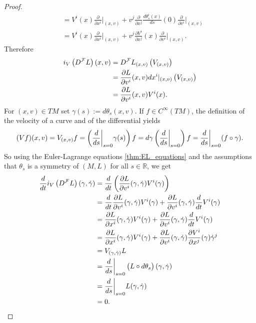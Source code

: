 \begin{proof}
\begin{align*}
		&= V^i(x)\frac{\partial}{\partial x^i}\bigg\vert_{(x,v)} + v^j\frac{\partial}{\partial x^j} \frac{d \theta_s^i(x)}{ds}(0) \frac{\partial}{\partial v^i}\bigg\vert_{(x,v)}\\
		&= V^i(x)\frac{\partial}{\partial x^i}\bigg\vert_{(x,v)} + v^j\frac{\partial V^i}{\partial x^j}(x) \frac{\partial}{\partial v^i}\bigg\vert_{(x,v)}.
	\end{align*}
	Therefore
	\begin{align*}
		i_V\del[1]{D^\mathcal{F}L}(x,v) &= D^\mathcal{F}L_{(x,v)}\del[1]{V_{(x,v)}}\\
		&= \frac{\partial L}{\partial v^i}(x,v)dx^i\vert_{(x,v)}\del[1]{V_{(x,v)}}\\
		&= \frac{\partial L}{\partial v^i}(x,v) V^i(x).
	\end{align*}
	For $(x,v) \in TM$ set $\gamma(s) := d\theta_s(x,v)$. If $f \in C^\infty(TM)$, the definition of the velocity of a curve and of the differential yields
	\begin{equation*}
		(Vf)(x,v) = V_{(x,v)}f = \del[3]{\frac{d}{ds}\bigg\vert_{s = 0}\gamma(s)}f= d\gamma\del[3]{\frac{d}{ds}\bigg\vert_{s = 0}}f = \frac{d}{ds}\bigg\vert_{s = 0}(f \circ \gamma).
	\end{equation*}
	So using the Euler-Lagrange equations \ref{thm:EL_equations} and the assumptions that $\theta_s$ is a symmetry of $(M,L)$ for all $s \in \mathbb{R}$, we get
	\begin{align*}
		\frac{d}{dt}i_V\del[1]{D^\mathcal{F}L}(\gamma,\dot{\gamma}) &= \frac{d}{dt}\del[3]{\frac{\partial L}{\partial v^i}(\gamma,\dot{\gamma}) V^i(\gamma)}\\
		&= \frac{d}{dt}\frac{\partial L}{\partial v^i}(\gamma,\dot{\gamma}) V^i(\gamma) + \frac{\partial L}{\partial v^i}(\gamma,\dot{\gamma}) \frac{d}{dt}V^i(\gamma)\\
		&= \frac{\partial L}{\partial x^i}(\gamma,\dot{\gamma}) V^i(\gamma) + \frac{\partial L}{\partial v^i}(\gamma,\dot{\gamma}) \frac{d}{dt}V^i(\gamma)\\
		&= \frac{\partial L}{\partial x^i}(\gamma,\dot{\gamma}) V^i(\gamma) + \frac{\partial L}{\partial v^i}(\gamma,\dot{\gamma}) \frac{\partial V^i}{\partial x^j}(\gamma)\dot{\gamma}^j\\
		&= V_{(\gamma,\dot{\gamma})}L\\
		&= \frac{d}{ds}\bigg\vert_{s = 0} \del[1]{L \circ d\theta_s}(\gamma,\dot{\gamma})\\
		&= \frac{d}{ds}\bigg\vert_{s = 0} L(\gamma,\dot{\gamma})\\
		&= 0.
	\end{align*}
\end{proof}
